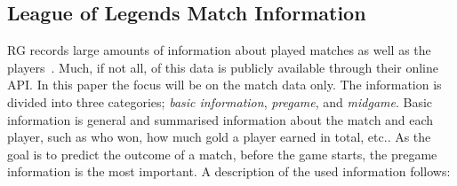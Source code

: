 \subsection{League of Legends Match Information}\label{sec:matchdata}
RG records large amounts of information about played matches as well as the players~\cite{matchinfo}. Much, if not all, of this data is publicly available through their online API. In this paper the focus will be on the match data only. The information is divided into three categories; \emph{basic information}, \emph{pregame}, and \emph{midgame}. Basic information is general and summarised information about the match and each player, such as who won, how much gold a player earned in total, etc.. As the goal is to predict the outcome of a match, before the game starts, the pregame information is the most important. A description of the used information follows:
